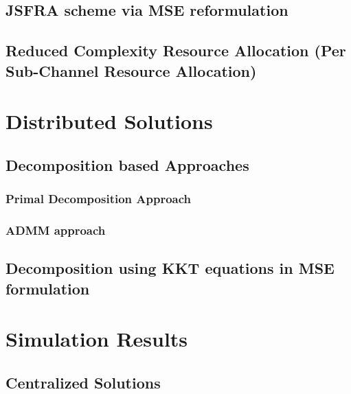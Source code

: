 \documentclass[10pt,final,twocolumn,letterpaper]{./../Styles/IEEEtran}
\begin{document}
\subsection{\ac{JSFRA} scheme via \ac{MSE} reformulation} \label{sec-3.3}


\subsection{Reduced Complexity Resource Allocation (Per Sub-Channel Resource Allocation)} \label{sec-3.4}


\section{Distributed Solutions} \label{sec-4}



\subsection{Decomposition based Approaches}

\subsubsection{Primal Decomposition Approach} \label{sec-4.1}


%

\subsubsection{\ac{ADMM} approach} \label{sec-4.2}


%

\subsection{Decomposition using \ac{KKT} equations in \ac{MSE} formulation} \label{sec-4.3}



\section{Simulation Results} \label{sec-5}


\subsection{Centralized Solutions}

\end{document}
